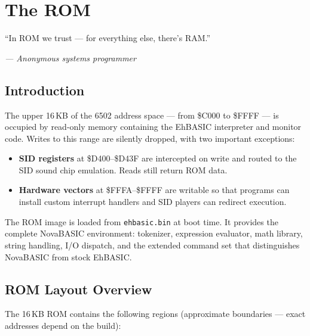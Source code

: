 \chapter{The ROM}

\epigraph{``In ROM we trust --- for everything else, there's RAM.''}%
         {\textit{--- Anonymous systems programmer}}

\section*{Introduction}

The upper 16\,KB of the 6502 address space --- from \$C000 to \$FFFF ---
is occupied by read-only memory containing the EhBASIC interpreter and
monitor code.  Writes to this range are silently dropped, with two
important exceptions:

\begin{itemize}
  \item \textbf{SID registers} at \$D400--\$D43F are intercepted on write
        and routed to the SID sound chip emulation.  Reads still return ROM
        data.
  \item \textbf{Hardware vectors} at \$FFFA--\$FFFF are writable so that
        programs can install custom interrupt handlers and SID players can
        redirect execution.
\end{itemize}

The ROM image is loaded from \texttt{ehbasic.bin} at boot time.  It
provides the complete NovaBASIC environment: tokenizer, expression
evaluator, math library, string handling, I/O dispatch, and the extended
command set that distinguishes NovaBASIC from stock EhBASIC.


\section{ROM Layout Overview}
\label{sec:rom-layout}


The 16\,KB ROM contains the following regions (approximate boundaries ---
exact addresses depend on the build):

